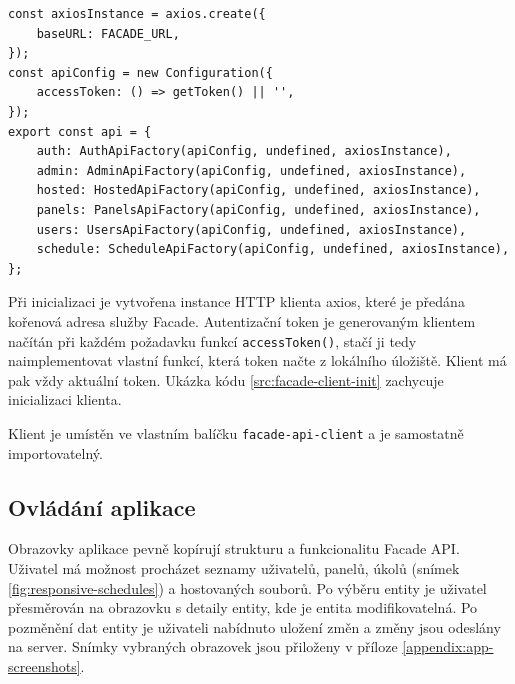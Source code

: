 \begin{lstlisting}[label=src:facade-client-init,caption={Inicializace Facade API klienta}]
const axiosInstance = axios.create({
	baseURL: FACADE_URL,
});
const apiConfig = new Configuration({
	accessToken: () => getToken() || '',
});
export const api = {
	auth: AuthApiFactory(apiConfig, undefined, axiosInstance),
	admin: AdminApiFactory(apiConfig, undefined, axiosInstance),
	hosted: HostedApiFactory(apiConfig, undefined, axiosInstance),
	panels: PanelsApiFactory(apiConfig, undefined, axiosInstance),
	users: UsersApiFactory(apiConfig, undefined, axiosInstance),
	schedule: ScheduleApiFactory(apiConfig, undefined, axiosInstance),
};
\end{lstlisting}

Při inicializaci je vytvořena instance HTTP klienta axios\cite{AxiosAxios2024}, které je předána kořenová adresa služby Facade. Autentizační token je generovaným klientem načítán při každém požadavku funkcí \lstinline|accessToken()|, stačí ji tedy naimplementovat vlastní funkcí, která token načte z lokálního úložiště. Klient má pak vždy aktuální token. Ukázka kódu \ref{src:facade-client-init} zachycuje inicializaci klienta.

Klient je umístěn ve vlastním balíčku \lstinline|facade-api-client| a je samostatně importovatelný.

\subsection{Ovládání aplikace}
Obrazovky aplikace pevně kopírují strukturu a funkcionalitu Facade API. Uživatel má možnost procházet seznamy uživatelů, panelů, úkolů (snímek \ref{fig:responsive-schedules}) a hostovaných souborů. Po výběru entity je uživatel přesměrován na obrazovku s detaily entity, kde je entita modifikovatelná. Po pozměnění dat entity je uživateli nabídnuto uložení změn a změny jsou odeslány na server. Snímky vybraných obrazovek jsou přiloženy v příloze \ref{appendix:app-screenshots}.

